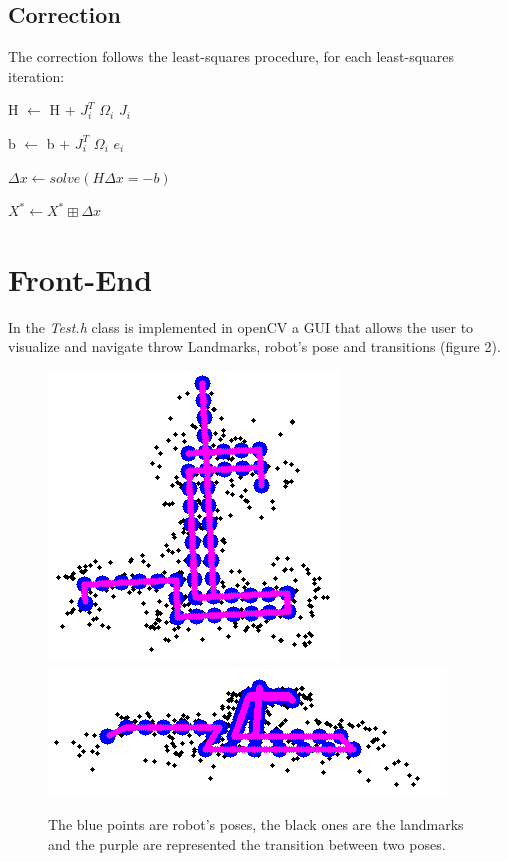 \documentclass[10pt]{article}
\begin{document}
	\subsection{Correction}
	The correction follows the least-squares procedure, for each least-squares iteration:
	\begin{center}
		H $\leftarrow$ H + $J_{\textit{i}}^{T}$ $\Omega_{\textit{i}}$ $J_{\textit{i}}$		
	
		b $\leftarrow$ b + $J_{\textit{i}}^{T}$ $\Omega_{\textit{i}}$ $e_{\textit{i}}$ 
	
		$\Delta x \leftarrow solve(H\Delta x=-b)$
	
		$X^* \leftarrow X^* \boxplus \Delta x$
	\end{center}
	
	\section{Front-End}
	In the \textit{Test.h} class is implemented in openCV a GUI that allows the user to visualize and navigate throw Landmarks, robot's pose and transitions (figure 2). 
	
	\begin{figure}
		\centering
		\includegraphics[width=0.5\linewidth]{img/exact}
		\includegraphics[width=0.8\linewidth]{img/exact2}
		\caption{The blue points are robot's poses, the black ones are the landmarks and the purple are represented the transition between two poses.}
		\label{fig:exact}
	\end{figure}
	
\end{document}
